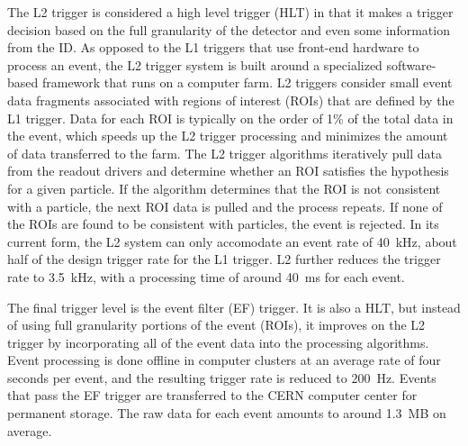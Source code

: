 The L2 trigger is considered a high level trigger (HLT) in that it makes a
trigger decision based on the full granularity of the detector and
even some information from the ID. As opposed to the L1 triggers that
use front-end hardware to process an event, the L2 trigger system is
built around a specialized software-based framework that runs on a
computer farm. L2 triggers consider small event data fragments
associated with regions of interest (ROIs) that are defined by the L1
trigger. Data for each ROI is typically on the order of 1\% of the
total data in the event, which speeds up the L2 trigger processing and
minimizes the amount of data transferred to the farm. The L2 trigger
algorithms iteratively pull data from the readout drivers and determine
whether an ROI satisfies the hypothesis for a given particle. If the
algorithm determines that the ROI is not consistent with a particle,
the next ROI data is pulled and the process repeats. If none of the
ROIs are found to be consistent with particles, the event is
rejected. In its current form, the L2 system can only accomodate an
event rate of 40~kHz, about half of the design trigger rate for the L1
trigger. L2 further reduces the trigger rate to 3.5~kHz, with a
processing time of around 40~ms for each event. 

The final trigger level is the event filter (EF) trigger. It is also a
HLT, but instead of using full granularity portions of the event (ROIs), it
improves on the L2 trigger by incorporating all of the event data into
the processing algorithms. Event processing is done offline in
computer clusters at an average rate of four seconds
per event, and the resulting trigger rate is reduced to 200~Hz. Events
that pass the EF trigger are transferred to the CERN computer center
for permanent storage. The raw data for each event amounts to around
1.3~MB on average. 
